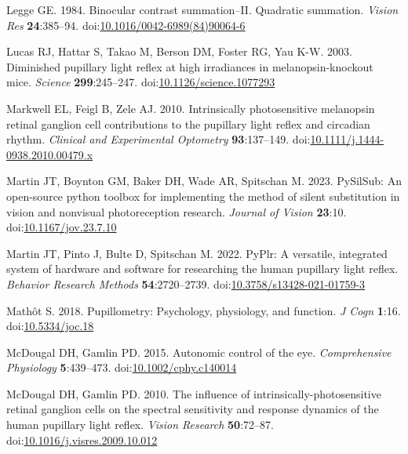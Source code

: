 \documentclass[
]{article}
\newlength{\cslhangindent}
\newlength{\cslentryspacingunit} %
\newenvironment{CSLReferences}[2] %
 {%
  \setlength{\parindent}{0pt}
  \ifodd #1
  \let\oldpar\par
  \def\par{\hangindent=\cslhangindent\oldpar}
  \fi
  \setlength{\parskip}{#2\cslentryspacingunit}
 }%
 {}
\begin{document}
\begin{CSLReferences}{1}{0}
\leavevmode{}%
Legge GE. 1984. Binocular contrast summation--II. Quadratic summation. \emph{Vision Res} \textbf{24}:385--94. doi:\href{https://doi.org/10.1016/0042-6989(84)90064-6}{10.1016/0042-6989(84)90064-6}

\leavevmode{}%
Lucas RJ, Hattar S, Takao M, Berson DM, Foster RG, Yau K-W. 2003. Diminished pupillary light reflex at high irradiances in melanopsin-knockout mice. \emph{Science} \textbf{299}:245--247. doi:\href{https://doi.org/10.1126/science.1077293}{10.1126/science.1077293}

\leavevmode{}%
Markwell EL, Feigl B, Zele AJ. 2010. Intrinsically photosensitive melanopsin retinal ganglion cell contributions to the pupillary light reflex and circadian rhythm. \emph{Clinical and Experimental Optometry} \textbf{93}:137--149. doi:\href{https://doi.org/10.1111/j.1444-0938.2010.00479.x}{10.1111/j.1444-0938.2010.00479.x}

\leavevmode{}%
Martin JT, Boynton GM, Baker DH, Wade AR, Spitschan M. 2023. PySilSub: An open-source python toolbox for implementing the method of silent substitution in vision and nonvisual photoreception research. \emph{Journal of Vision} \textbf{23}:10. doi:\href{https://doi.org/10.1167/jov.23.7.10}{10.1167/jov.23.7.10}

\leavevmode{}%
Martin JT, Pinto J, Bulte D, Spitschan M. 2022. PyPlr: A versatile, integrated system of hardware and software for researching the human pupillary light reflex. \emph{Behavior Research Methods} \textbf{54}:2720--2739. doi:\href{https://doi.org/10.3758/s13428-021-01759-3}{10.3758/s13428-021-01759-3}

\leavevmode{}%
Mathôt S. 2018. Pupillometry: Psychology, physiology, and function. \emph{J Cogn} \textbf{1}:16. doi:\href{https://doi.org/10.5334/joc.18}{10.5334/joc.18}

\leavevmode{}%
McDougal DH, Gamlin PD. 2015. Autonomic control of the eye. \emph{Comprehensive Physiology} \textbf{5}:439--473. doi:\href{https://doi.org/10.1002/cphy.c140014}{10.1002/cphy.c140014}

\leavevmode{}%
McDougal DH, Gamlin PD. 2010. The influence of intrinsically-photosensitive retinal ganglion cells on the spectral sensitivity and response dynamics of the human pupillary light reflex. \emph{Vision Research} \textbf{50}:72--87. doi:\href{https://doi.org/10.1016/j.visres.2009.10.012}{10.1016/j.visres.2009.10.012}


\end{CSLReferences}
\end{document}
